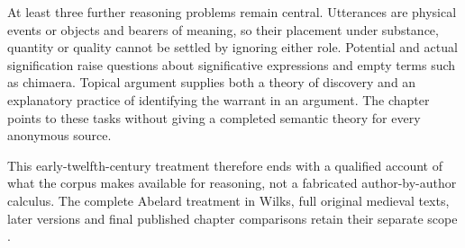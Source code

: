 At least three further reasoning problems remain central.
Utterances are physical events or objects and bearers of meaning,
so their placement under substance, quantity or quality cannot
be settled by ignoring either role.
Potential and actual signification raise questions about
significative expressions and empty terms such as chimaera.
Topical argument supplies both a theory of discovery and an
explanatory practice of identifying the warrant in an argument.
The chapter points to these tasks without giving a completed
semantic theory for every anonymous source.

This early-twelfth-century treatment therefore ends with a
qualified account of what the corpus makes available for reasoning,
not a fabricated author-by-author calculus. The complete
Abelard treatment in Wilks, full original medieval texts,
later versions and final published chapter comparisons retain
their separate scope
\cite[pp.~75--79]{Marenbon2007FordhamTurnTwelfth}.
